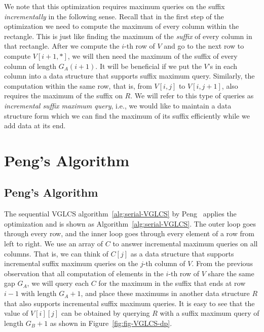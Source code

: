 We note that this optimization requires maximum queries on the suffix
{\em incrementally} in the following sense.  Recall that in the first
step of the optimization we need to compute the maximum of every
column within the rectangle.  This is just like finding the maximum of
the {\em suffix} of every column in that rectangle.  After we compute
the $i$-th row of $V$ and go to the next row to compute $V[i + 1, *]$,
we will then need the maximum of the suffix of every column of length
$G_A(i + 1)$.  It will be beneficial if we put the $V$'s in each
column into a data structure that supports suffix maximum query.
Similarly, the computation within the same row, that is, from $V[i,j]$
to $V[i, j + 1]$, also requires the maximum of the suffix on $R$.  We
will refer to this type of queries as {\em incremental suffix maximum
  query}, i.e., we would like to maintain a data structure form which
we can find the maximum of its suffix efficiently while we add data at
its end.


\ifdefined\MasterThesis
\section{Peng's Algorithm}
\else
\subsection{Peng's Algorithm}
\fi

The sequential VGLCS algorithm~\ref{alg:serial-VGLCS} by
Peng~\cite{Peng2011TheLC} applies the optimization and is shown as
Algorithm~\ref{alg:serial-VGLCS}.  The outer loop goes through every
row, and the inner loop goes through every element of a row from left
to right.  We use an array of $C$ to answer incremental maximum
queries on all columns.  That is, we can think of $C[j]$ as a data
structure that supports incremental suffix maximum queries on the
$j$-th column of $V$.  From the previous observation that all
computation of elements in the $i$-th row of $V$ share the same gap
$G_A$, we will query each $C$ for the maximum in the suffix that ends
at row $i-1$ with length $G_A + 1$, and place these maximums in
another data structure $R$ that also supports incremental suffix
maximum queries.  It is easy to see that the value of $V[i][j]$ can be
obtained by querying $R$ with a suffix maximum query of length $G_B +
1$ as shown in Figure~\ref{fig:fig-VGLCS-dp}.

